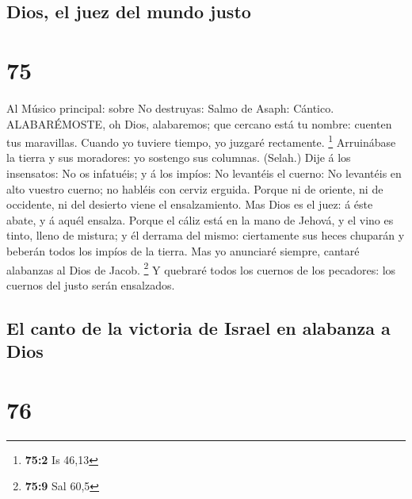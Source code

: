 \hypertarget{dios-el-juez-del-mundo-justo}{%
\subsection{Dios, el juez del mundo
justo}\label{dios-el-juez-del-mundo-justo}}

\hypertarget{section-74}{%
\section{75}\label{section-74}}

 Al Músico principal: sobre No destruyas: Salmo de Asaph:
Cántico. ALABARÉMOSTE, oh Dios, alabaremos; que cercano está tu nombre:
cuenten tus maravillas.  Cuando yo tuviere tiempo, yo
juzgaré rectamente. \footnote{\textbf{75:2} Is 46,13} 
Arruinábase la tierra y sus moradores: yo sostengo sus columnas.
(Selah.)  Dije á los insensatos: No os infatuéis; y á los
impíos: No levantéis el cuerno:  No levantéis en alto
vuestro cuerno; no habléis con cerviz erguida.  Porque ni de
oriente, ni de occidente, ni del desierto viene el ensalzamiento.
 Mas Dios es el juez: á éste abate, y á aquél ensalza.
 Porque el cáliz está en la mano de Jehová, y el vino es
tinto, lleno de mistura; y él derrama del mismo: ciertamente sus heces
chuparán y beberán todos los impíos de la tierra.  Mas yo
anunciaré siempre, cantaré alabanzas al Dios de Jacob. \footnote{\textbf{75:9}
  Sal 60,5}  Y quebraré todos los cuernos de los pecadores:
los cuernos del justo serán ensalzados.

\hypertarget{el-canto-de-la-victoria-de-israel-en-alabanza-a-dios}{%
\subsection{El canto de la victoria de Israel en alabanza a
Dios}\label{el-canto-de-la-victoria-de-israel-en-alabanza-a-dios}}

\hypertarget{section-75}{%
\section{76}\label{section-75}}


